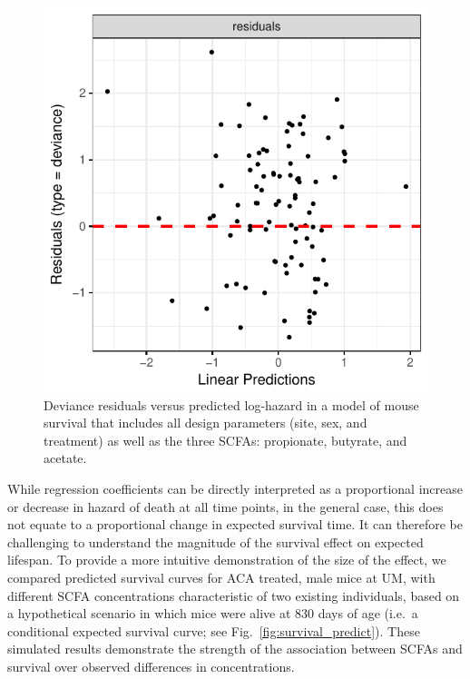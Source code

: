 \documentclass{doc/template/bmcart-nofigbox}
\begin{document}
\begin{figure}[h!]
  \includegraphics{fig/phreg_residuals.pdf}
  \caption{\label{fig:phreg_residuals}
  Deviance residuals versus predicted log-hazard in a model of mouse
  survival that includes all design parameters (site, sex, and treatment)
  as well as the three SCFAs: propionate, butyrate, and acetate.
  }
\end{figure}

While regression coefficients can be directly interpreted as a proportional
increase or decrease in hazard of death at all time points, in the general
case, this does not equate to a proportional change in expected survival time.
It can therefore be challenging to understand the magnitude of the survival
effect on expected lifespan.
To provide a more intuitive demonstration of the size of the effect,
we compared predicted survival curves for ACA treated, male mice
at UM, with different SCFA concentrations characteristic of two existing
individuals, based on a hypothetical
scenario in which mice were alive at 830 days of age (i.e.~a conditional
expected survival curve; see Fig.~\ref{fig:survival_predict}).
These simulated results demonstrate the strength of the association between
SCFAs and survival over observed differences in concentrations.
\end{document}

